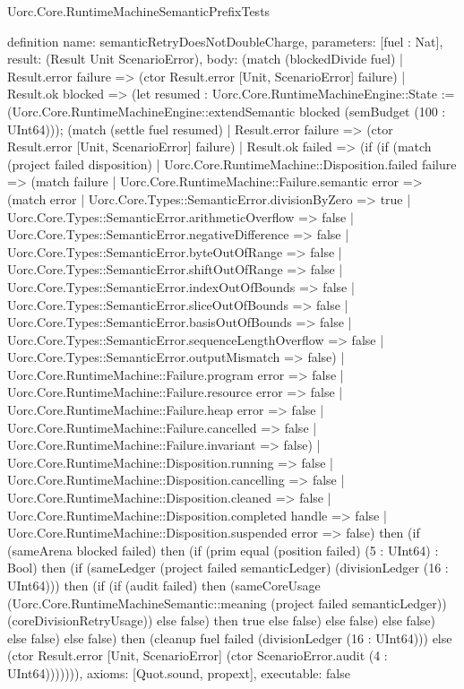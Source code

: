 \begin{lexlean}{Uorc.Core.RuntimeMachineSemanticPrefixTests}
\begin{semanticmodule}
definition{
  name: semanticRetryDoesNotDoubleCharge,
  parameters: [fuel : Nat],
  result: (Result Unit ScenarioError),
  body: (match (blockedDivide fuel)
    | Result.error failure => (ctor Result.error [Unit, ScenarioError] failure)
    | Result.ok blocked => (let resumed : Uorc.Core.RuntimeMachineEngine::State := (Uorc.Core.RuntimeMachineEngine::extendSemantic blocked (semBudget (100 : UInt64))); (match (settle fuel resumed)
      | Result.error failure => (ctor Result.error [Unit, ScenarioError] failure)
      | Result.ok failed => (if (if (match (project failed disposition)
        | Uorc.Core.RuntimeMachine::Disposition.failed failure => (match failure
          | Uorc.Core.RuntimeMachine::Failure.semantic error => (match error
            | Uorc.Core.Types::SemanticError.divisionByZero => true
            | Uorc.Core.Types::SemanticError.arithmeticOverflow => false
            | Uorc.Core.Types::SemanticError.negativeDifference => false
            | Uorc.Core.Types::SemanticError.byteOutOfRange => false
            | Uorc.Core.Types::SemanticError.shiftOutOfRange => false
            | Uorc.Core.Types::SemanticError.indexOutOfBounds => false
            | Uorc.Core.Types::SemanticError.sliceOutOfBounds => false
            | Uorc.Core.Types::SemanticError.basisOutOfBounds => false
            | Uorc.Core.Types::SemanticError.sequenceLengthOverflow => false
            | Uorc.Core.Types::SemanticError.outputMismatch => false)
          | Uorc.Core.RuntimeMachine::Failure.program error => false
          | Uorc.Core.RuntimeMachine::Failure.resource error => false
          | Uorc.Core.RuntimeMachine::Failure.heap error => false
          | Uorc.Core.RuntimeMachine::Failure.cancelled => false
          | Uorc.Core.RuntimeMachine::Failure.invariant => false)
        | Uorc.Core.RuntimeMachine::Disposition.running => false
        | Uorc.Core.RuntimeMachine::Disposition.cancelling => false
        | Uorc.Core.RuntimeMachine::Disposition.cleaned => false
        | Uorc.Core.RuntimeMachine::Disposition.completed handle => false
        | Uorc.Core.RuntimeMachine::Disposition.suspended error => false) then (if (sameArena blocked failed) then (if (prim equal (position failed) (5 : UInt64) : Bool) then (if (sameLedger (project failed semanticLedger) (divisionLedger (16 : UInt64))) then (if (if (audit failed) then (sameCoreUsage (Uorc.Core.RuntimeMachineSemantic::meaning (project failed semanticLedger)) (coreDivisionRetryUsage)) else false) then true else false) else false) else false) else false) else false) then (cleanup fuel failed (divisionLedger (16 : UInt64))) else (ctor Result.error [Unit, ScenarioError] (ctor ScenarioError.audit (4 : UInt64))))))),
  axioms: [Quot.sound, propext],
  executable: false
}


\end{semanticmodule}
\end{lexlean}
